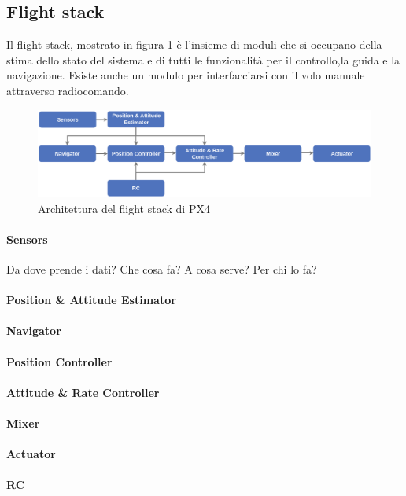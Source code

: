 \begin{it}
	\subsection{Flight stack}
	Il flight stack, mostrato in figura \ref{fig:px4.flightstack} è l'insieme di moduli che si occupano della stima dello stato del sistema e di tutti le funzionalità per il controllo,la guida e la navigazione. Esiste anche un modulo per interfacciarsi con il volo manuale attraverso radiocomando.
		\begin{figure}[ht]
		\centering
		\includegraphics[width=1\textwidth]{Contestualizzazione/Figure/PX4_High-Level_Flight-Stack}
		\caption{Architettura del flight stack di PX4}
		\label{fig:px4.flightstack}
	\end{figure}
	\paragraph{Sensors}
		Da dove prende i dati?
		Che cosa fa?
		A cosa serve?
	  	Per chi lo fa?
	\paragraph{Position \& Attitude Estimator}
	\paragraph{Navigator}
	\paragraph{Position Controller}
	\paragraph{Attitude \& Rate Controller}
	\paragraph{Mixer}
	\paragraph{Actuator}
	\paragraph{RC}
	
	
	
\end{it}

